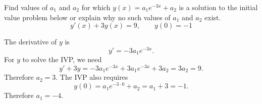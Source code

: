 \documentclass[]{ximera}
\begin{document}
\begin{problem} 
Find values of $a_1$ and $a_2$ for which $y(x) = a _1 e^{-3x}+a_2$ is a solution to the initial value problem below or explain why no such values of $a_1$ and $a_2$ exist.  $$y'(x) +3y(x) = 9  , \qquad y(0) = -1 $$

\begin{solution}
The derivative of $y$ is 
$$
y' = -3 a_1 e^{-3x}.
$$
For $y$ to solve the IVP, we need
$$
y' + 3y = -3a_1 e^{-3x} + 3a_1 e^{-3x} + 3 a_2 = 3 a_2 = 9.
$$
Therefore $a_2 = 3$. The IVP also requires 
$$
y(0) = a_1 e^{-3 \cdot 0} + a_2 = a_1 + 3 = -1.
$$
Therefore $a_1 = -4$. 
\end{solution}
\end{problem}
\end{document}
